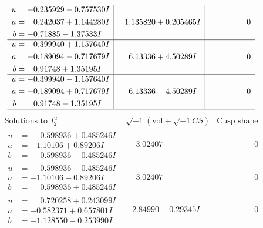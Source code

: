 \documentclass[1p]{elsarticle_modified}
\theoremstyle{definition}
\newcommand{\I}{\sqrt{-1}}
\begin{document}
$$\begin{array}{c|c|c}
\begin{aligned}
u &= -0.235929 - 0.757530 I \\
a &= \phantom{-}0.242037 + 1.144280 I \\
b &= -0.71885 - 1.37533 I\end{aligned}
 & \phantom{-}1.135820 + 0.205465 I & \phantom{-0.000000 } 0 \\ \hline\begin{aligned}
u &= -0.399940 + 1.157640 I \\
a &= -0.189094 - 0.717679 I \\
b &= \phantom{-}0.91748 + 1.35195 I\end{aligned}
 & \phantom{-}6.13336 + 4.50289 I & \phantom{-0.000000 } 0 \\ \hline\begin{aligned}
u &= -0.399940 - 1.157640 I \\
a &= -0.189094 + 0.717679 I \\
b &= \phantom{-}0.91748 - 1.35195 I\end{aligned}
 & \phantom{-}6.13336 - 4.50289 I & \phantom{-0.000000 } 0\\
 \hline 
 \end{array}$$\newpage$$\begin{array}{c|c|c}  
\text{Solutions to }I^u_{2}& \I (\text{vol} + \sqrt{-1}CS) & \text{Cusp shape}\\
 \hline 
\begin{aligned}
u &= \phantom{-}0.598936 + 0.485246 I \\
a &= -1.10106 + 0.89206 I \\
b &= \phantom{-}0.598936 - 0.485246 I\end{aligned}
 & \phantom{-}3.02407\phantom{ +0.000000I} & \phantom{-0.000000 } 0 \\ \hline\begin{aligned}
u &= \phantom{-}0.598936 - 0.485246 I \\
a &= -1.10106 - 0.89206 I \\
b &= \phantom{-}0.598936 + 0.485246 I\end{aligned}
 & \phantom{-}3.02407\phantom{ +0.000000I} & \phantom{-0.000000 } 0 \\ \hline\begin{aligned}
u &= \phantom{-}0.720258 + 0.243099 I \\
a &= -0.582371 + 0.657801 I \\
b &= -1.128550 - 0.253990 I\end{aligned}
 & -2.84990 - 0.29345 I & \phantom{-0.000000 } 0 \\ \hline\begin{aligned}

\end{aligned}
\end{array}$$
\end{document}
